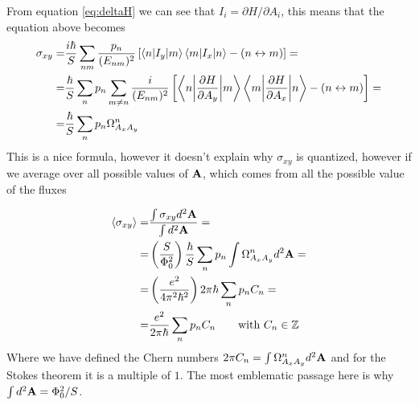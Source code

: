 From equation \ref{eq:deltaH} we can see that $I_i=\partial H/\partial A_i$, this means that the equation above becomes
\begin{equation}
    \begin{split}
        \sigma_{xy}=&
        \frac{i\hbar}S\sum_{nm}\frac{p_n}{(E_{nm})^2}\left[
        \braket{n|I_y}{m}\braket{m|I_x}{n} - (n\leftrightarrow m)
    \right]=\\
    =&\frac \hbar S\sum_{n}p_n\sum_{m\neq n}\frac{i}{(E_{nm})^2}\left[
    \braket{n\bigg|\frac{\partial H}{\partial A_y}}{m}\braket{m\bigg|\frac{\partial H}{\partial A_x}}{n} - (n\leftrightarrow m)
    \right]=\\
    =&\frac \hbar S\sum_{n}p_n\Omega^n_{A_xA_y}
    \end{split}
\end{equation}
This is a nice formula, however it doesn't explain why $\sigma_{xy}$ is quantized, however if we average over all possible values of $\mathbf{A}$, which comes from all the possible value of the fluxes

\begin{equation}
    \begin{split}
        \langle\sigma_{xy}\rangle=&
        \frac{\int \sigma_{xy}d^2\mathbf{A}}{\int d^2\mathbf{A}}=\\
        =&\left(\frac{S}{\Phi_0^2}\right)\frac \hbar S\sum_np_n\int \Omega^n_{A_xA_y}d^2\mathbf{A} =\\
        =&\left(\frac{e^2}{4\pi^2\hbar^2}\right)2\pi\hbar\sum_np_nC_n=\\
        =&\frac{e^2}{2\pi\hbar}\sum_np_nC_n\quad \quad \text{with }C_n\in \mathbb Z
    \end{split}
    \label{eq:quantized sigma}
\end{equation}
Where we have defined the Chern numbers $2\pi C_n=\int \Omega^n_{A_xA_y}d^2\mathbf{A}$ and for the Stokes theorem it is a multiple of $1$. The most emblematic passage here is why $\int d^2\mathbf{A}=\Phi_0^2/S$.\\

